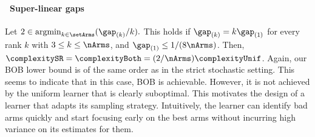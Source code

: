 \paragraph{\raisebox{.04cm}{\textcolor{bull}{$\blacktriangleright$}}~Super-linear gaps} Let $2\in\argmin_{k\in\setArms} (\gap_{(k)}/k).$ 
This holds if 
$\gap_{(k)}=k\gap_{(1)}$ for every rank $k$ with $3\leq k\leq\nArms$,
and $\gap_{(1)}\leq 1/(8\nArms)$. Then, 
$\complexitySR=\complexityBoth=(2/\nArms) \complexityUnif$. 
Again, our BOB lower bound is of the same order as in 
the strict stochastic setting. This seems to indicate that in this case, BOB is achievable. However, it is not achieved by the uniform 
learner that is clearly suboptimal. This motivates the design of a learner that adapts its sampling strategy. Intuitively,  the learner can  
identify bad arms quickly
and  start focusing early on the best arms without incurring 
high variance on its estimates for them.
%
